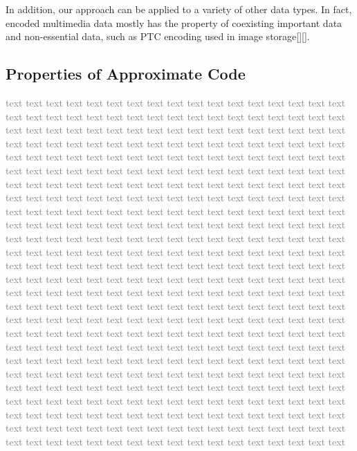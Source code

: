 \documentclass[sigconf]{acmart}
\begin{document}
In addition, our approach can be applied to a variety of other data types. In fact, encoded multimedia data mostly has the property of coexisting important data and non-essential data, such as PTC encoding used in image storage[][].


\subsection{Properties of Approximate Code}


\textcolor{gray}{
    text text text text text text text text text text text text text text text text text text text text text text text text text text text text text text text text text text text text text text text text text text text text text text text text text text text text text text text text text text text text text text text text text text text text text text text text text text text text text text text text text text text text text text text text text text text text text text text text text text text text text text text text text text text text text text text text text text text text text text text text text text text text text text text text text text text text text text text text text text text text text text text text text text text text text text text text text text text text text text text text text text text text text text text text text text text text text text text text text text text text text text text text text text text text text text text text text text text text text text text text text text text text text text text text text text text text text text text text text text text text text text text text text text text text text text text text text text text text text text text text text text text text text text text text text text text text text text text text text text text text text text text text text text text text text text text text text text text text text text text text text text text text text text text text text text text text text text text text text text text text text text text text text text text text text text text text text text text text text text text text text text text text text text text text text text text text text text text text text text text text text text text text text text text text text text text text text text text text text text text text text text text text text text text text text text text text text text text text text text text text text text text text text text text text text text text text text text text text text text text text text text text text text text text text text text text text text text text text text text text text text text text text text text text text text text text text text text text text text text text text text text 
}
\end{document}

